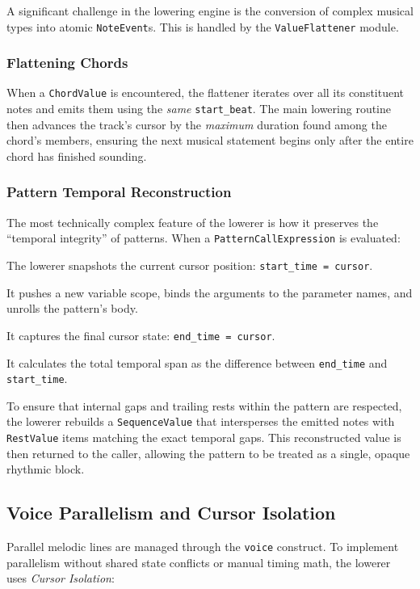 A significant challenge in the lowering engine is the conversion of complex musical types into atomic
\texttt{NoteEvent}s.
This is handled by the \texttt{ValueFlattener} module.

\subsubsection{Flattening Chords}
When a \texttt{ChordValue} is encountered, the flattener iterates over all its constituent notes and emits them using
the \textit{same} \texttt{start\_beat}.
The main lowering routine then advances the track's cursor by the \textit{maximum} duration found among the chord's
members, ensuring the next musical statement begins only after the entire chord has finished sounding.

\subsubsection{Pattern Temporal Reconstruction}
The most technically complex feature of the lowerer is how it preserves the ``temporal integrity'' of patterns.
When a \texttt{PatternCallExpression} is evaluated:

\noindent The lowerer snapshots the current cursor position: \texttt{start\_time = cursor}.

\noindent It pushes a new variable scope, binds the arguments to the parameter names, and unrolls the pattern's body.

\noindent It captures the final cursor state: \texttt{end\_time = cursor}.

\noindent It calculates the total temporal span as the difference between \texttt{end\_time} and \texttt{start\_time}.

To ensure that internal gaps and trailing rests within the pattern are respected, the lowerer rebuilds a
\texttt{SequenceValue} that intersperses the emitted notes with \texttt{RestValue} items matching the exact temporal
gaps.
This reconstructed value is then returned to the caller, allowing the pattern to be treated as a single, opaque rhythmic
block.

\subsection{Voice Parallelism and Cursor Isolation}\label{detail-subsec:voice-parallelism-and-cursor-isolation}

Parallel melodic lines are managed through the \texttt{voice} construct.
To implement parallelism without shared state conflicts or manual timing math, the lowerer uses
\textit{Cursor Isolation}:

